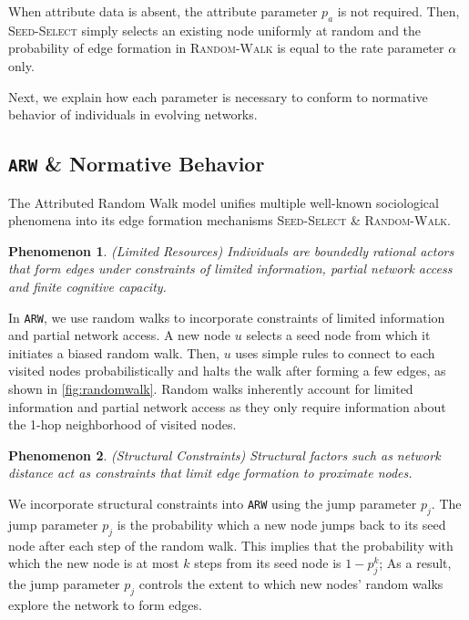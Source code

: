 When attribute data is absent, the attribute parameter $p_a$ is not required.
Then, \textsc{Seed-Select} simply selects an existing node uniformly at random
and the probability of edge formation in \textsc{Random-Walk} is equal to
the rate parameter $\alpha$ only.

Next, we explain how each parameter is necessary to conform to normative
behavior of individuals in evolving networks.

\subsection{\texttt{ARW} \& Normative Behavior}
\label{sub:Model Interpretation}

The Attributed Random Walk model unifies multiple well-known sociological phenomena
into its edge formation mechanisms \textsc{Seed-Select} \& \textsc{Random-Walk}.

\newtheorem{ph}{Phenomenon}

\begin{ph}
(Limited Resources) Individuals are boundedly rational \cite{simon1972theories,gigerenzer1996reasoning,lipman1995information}
actors that form edges under constraints of limited information, partial network access and finite cognitive capacity.
\end{ph}
In \texttt{ARW}, we use random walks to incorporate constraints of limited information
and partial network access. A new node $u$ selects a seed node from which it
initiates a biased random walk. Then, $u$ uses simple rules to connect to each visited
nodes probabilistically and halts the walk after forming a few edges, as shown in
\cref{fig:randomwalk}. Random walks inherently account for limited information
and partial network access as they only require information about the
1-hop neighborhood of visited nodes.

\begin{ph}
(Structural Constraints) Structural factors such as network distance
act as constraints that limit edge formation to proximate nodes.  \cite{35626}
\end{ph}

We incorporate structural constraints into \texttt{ARW} using the jump parameter $p_j$.
The jump parameter $p_j$ is the probability which a new node jumps back to its seed node
after each step of the random walk. This implies that the probability with which the new node
is at most $k$ steps from its seed node is $1-p^k_j$; As a result, the jump parameter $p_j$
controls the extent to which new nodes' random walks explore the network to form edges.


